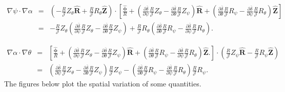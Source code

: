 \documentclass{llncs}
\newcommand{\tmmathbf}[1]{\ensuremath{\boldsymbol{#1}}}
\begin{document}
\begin{eqnarray}
  \nabla \psi \cdot \nabla \alpha & = & \left( - \frac{R}{\mathcal{J}}
  Z_{\theta} \hat{\mathbf{R}} + \frac{R}{\mathcal{J}} R_{\theta}
  \hat{\mathbf{Z}} \right) \cdot \left[ \frac{\hat{\tmmathbf{\phi}}}{R} +
  \left( \frac{\partial \overline{\delta}}{\partial \psi}
  \frac{R}{\mathcal{J}} Z_{\theta} - \frac{\partial
  \overline{\delta}}{\partial \theta} \frac{R}{\mathcal{J}} Z_{\psi} \right)
  \hat{\mathbf{R}} + \left( \frac{\partial \overline{\delta}}{\partial \theta}
  \frac{R}{\mathcal{J}} R_{\psi} - \frac{\partial \overline{\delta}}{\partial
  \psi} \frac{R}{\mathcal{J}} R_{\theta} \right) \hat{\mathbf{Z}} \right]
  \nonumber\\
  & = & - \frac{R}{\mathcal{J}} Z_{\theta} \left( \frac{\partial
  \overline{\delta}}{\partial \psi} \frac{R}{\mathcal{J}} Z_{\theta} -
  \frac{\partial \overline{\delta}}{\partial \theta} \frac{R}{\mathcal{J}}
  Z_{\psi} \right) + \frac{R}{\mathcal{J}} R_{\theta} \left( \frac{\partial
  \overline{\delta}}{\partial \theta} \frac{R}{\mathcal{J}} R_{\psi} -
  \frac{\partial \overline{\delta}}{\partial \psi} \frac{R}{\mathcal{J}}
  R_{\theta} \right) . 
\end{eqnarray}

\begin{eqnarray}
  \nabla \alpha \cdot \nabla \theta & = & \left[
  \frac{\hat{\tmmathbf{\phi}}}{R} + \left( \frac{\partial
  \overline{\delta}}{\partial \psi} \frac{R}{\mathcal{J}} Z_{\theta} -
  \frac{\partial \overline{\delta}}{\partial \theta} \frac{R}{\mathcal{J}}
  Z_{\psi} \right) \hat{\mathbf{R}} + \left( \frac{\partial
  \overline{\delta}}{\partial \theta} \frac{R}{\mathcal{J}} R_{\psi} -
  \frac{\partial \overline{\delta}}{\partial \psi} \frac{R}{\mathcal{J}}
  R_{\theta} \right) \hat{\mathbf{Z}} . \right] \cdot \left(
  \frac{R}{\mathcal{J}} Z_{\psi} \hat{\mathbf{R}} - \frac{R}{\mathcal{J}}
  R_{\psi} \hat{\mathbf{Z}} \right) \nonumber\\
  & = & \left( \frac{\partial \overline{\delta}}{\partial \psi}
  \frac{R}{\mathcal{J}} Z_{\theta} - \frac{\partial
  \overline{\delta}}{\partial \theta} \frac{R}{\mathcal{J}} Z_{\psi} \right)
  \frac{R}{\mathcal{J}} Z_{\psi} - \left( \frac{\partial
  \overline{\delta}}{\partial \theta} \frac{R}{\mathcal{J}} R_{\psi} -
  \frac{\partial \overline{\delta}}{\partial \psi} \frac{R}{\mathcal{J}}
  R_{\theta} \right) \frac{R}{\mathcal{J}} R_{\psi} . 
\end{eqnarray}
The figures below plot the spatial variation of some quantities.
\end{document}
